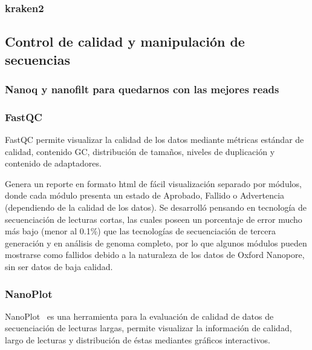 \subsubsection{kraken2}



\subsection{Control de calidad y manipulación de secuencias}
\subsubsection{Nanoq y nanofilt para quedarnos con las mejores reads}
\subsubsection{FastQC}
FastQC\cite{andrews2010fastqc} permite visualizar la calidad de los datos mediante métricas estándar de calidad, contenido GC, distribución de tamaños, niveles de duplicación  y contenido de adaptadores.


Genera un reporte en formato html de fácil visualización separado por módulos, donde cada módulo presenta un estado de Aprobado, Fallido o Advertencia (dependiendo de la calidad de los datos). 
Se desarrolló pensando en tecnología de secuenciación de lecturas cortas, las cuales poseen un porcentaje de error mucho más bajo (menor al 0.1\%) que las tecnologías de secuenciación de tercera generación y en análisis de genoma completo, por lo que algunos módulos pueden mostrarse como fallidos debido a la naturaleza de los datos de Oxford Nanopore, sin ser datos de baja calidad.
\subsubsection{NanoPlot}
NanoPlot~\cite{10.1093/bioinformatics/btad311} es una herramienta para la evaluación de calidad de datos de secuenciación de lecturas largas, permite visualizar la información de calidad, largo de lecturas y distribución de éstas mediantes gráficos interactivos.

